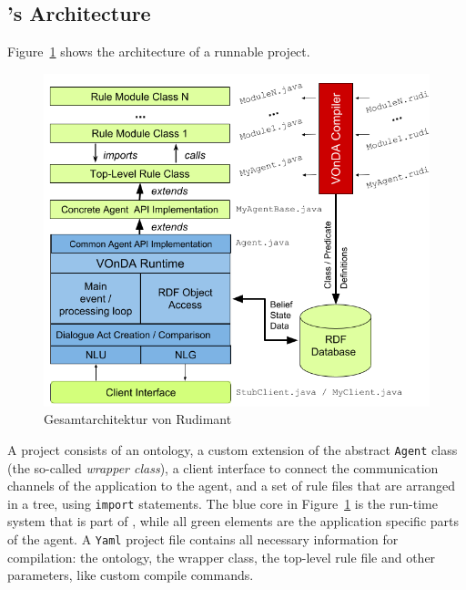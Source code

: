 \subsection{\vonda's Architecture}

Figure~\ref{fig:architecture} shows the architecture of a runnable \vonda project.


\begin{figure}[htbp]
  \centering
  \includegraphics[width=.8\textwidth]{VOnDAStructureRot2.png}
  \caption{Gesamtarchitektur von Rudimant}
  \label{fig:architecture}
\end{figure}


A \vonda project consists of an ontology, a custom extension of the abstract
\texttt{Agent} class (the so-called \emph{wrapper class}), a client interface
to connect the communication channels of the application to the agent, and a
set of rule files that are arranged in a tree, using \texttt{import}
statements. The blue core in Figure~\ref{fig:architecture} is the run-time system that
is part of \vonda, while all green elements are the application specific parts
of the agent. A \texttt{Yaml} project file contains all necessary information
for compilation: the ontology, the wrapper class, the top-level rule file and
other parameters, like custom compile commands.

